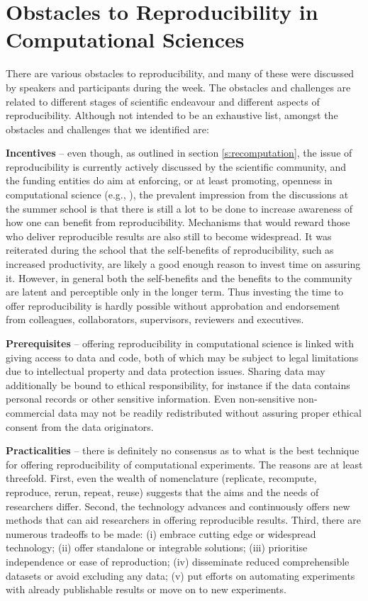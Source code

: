 \section{Obstacles to Reproducibility in Computational Sciences}
\label{s:obstacles}

There are various obstacles to reproducibility, and many of these were
  discussed by speakers and participants during the week. 
The obstacles and challenges are related to different stages of scientific 
  endeavour and different aspects of reproducibility.
Although not intended to be an exhaustive list, amongst the obstacles and 
  challenges that we identified are:

{\bf Incentives} -- even though, as outlined in section \ref{s:recomputation}, 
  the issue of reproducibility is
  currently actively discussed by the scientific community, 
  and the funding entities do aim at enforcing, or at least promoting,
  openness in computational science (e.g., \cite{NSF}), 
  the prevalent impression from the discussions at 
  the summer school is that there is still a lot to be done to increase 
  awareness of how one can benefit from reproducibility.
Mechanisms that would reward those who deliver reproducible results are also
  still to become widespread.
It was reiterated during the school that the self-benefits 
  of reproducibility, such as increased productivity, are likely 
  a good enough reason to invest time on assuring it.
However, in general both the self-benefits and the benefits to the community
  are latent and perceptible only in the longer term.
Thus investing the time to offer reproducibility is hardly possible without
  approbation and endorsement from colleagues, collaborators, supervisors,
  reviewers and executives.
  
{\bf Prerequisites} -- offering reproducibility in computational
  science is linked with giving access to data and code, both of which may
  be subject to legal limitations due to intellectual property and
  data protection issues.
Sharing data may additionally be bound to ethical responsibility, for instance
  if the data contains personal records or other sensitive information.  
Even non-sensitive non-commercial data may not be readily redistributed
  without assuring proper ethical consent from the data originators.

{\bf Practicalities} -- there is definitely no consensus as to what is the
  best technique for offering reproducibility of computational experiments. 
The reasons are at least threefold. 
First, even the wealth of nomenclature (replicate, recompute, reproduce, 
  rerun, repeat, reuse) suggests that the aims and the needs of researchers
  differ.
Second, the technology advances and continuously offers new methods that can
  aid researchers in offering reproducible results.
Third, there are numerous tradeoffs to be made: 
  (i) embrace cutting edge or widespread technology; 
  (ii) offer standalone or integrable solutions; 
  (iii) prioritise independence or ease of reproduction; 
  (iv) disseminate reduced comprehensible datasets or avoid excluding any data;
  (v) put efforts on automating experiments with already publishable results or
    move on to new experiments.
    
